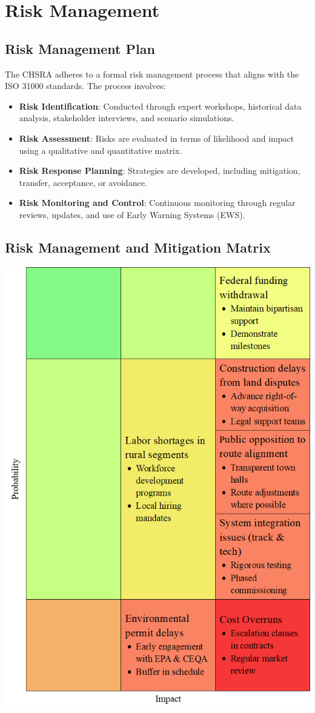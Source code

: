 \chapter{Risk Management}
\section{Risk Management Plan}
\justifying
\parindent20pt The CHSRA adheres to a formal risk management process that aligns with the ISO 31000 standards. The process involves: \begin{itemize}
	\item \textbf{Risk Identification}: Conducted through expert workshops, historical data analysis, stakeholder interviews, and scenario simulations.
	\item \textbf{Risk Assessment}: Risks are evaluated in terms of likelihood and impact using a qualitative and quantitative matrix.
	\item \textbf{Risk Response Planning}: Strategies are developed, including mitigation, transfer, acceptance, or avoidance.
	\item \textbf{Risk Monitoring and Control}: Continuous monitoring through regular reviews, updates, and use of Early Warning Systems (EWS).
\end{itemize}

\newpage
\section{Risk Management and Mitigation Matrix}

\noindent %
\begin{center}
\includegraphics[width=0.8\linewidth]{./attachments/probimp} \vspace*{0.5em}
\end{center}\par
\justifying